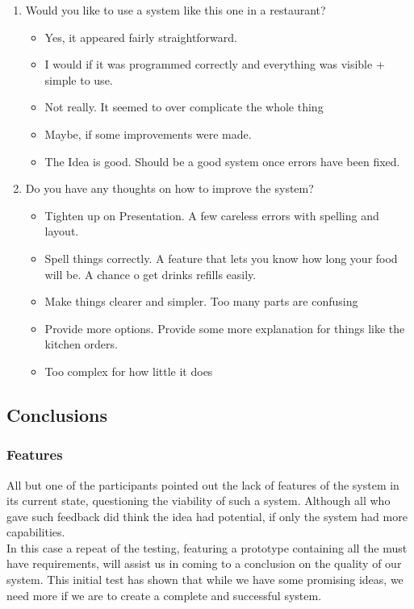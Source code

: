 \documentclass[11pt, a4paper]{report}
\begin{document}
\begin{enumerate}
\item Would you like to use a system like this one in a restaurant? \\
\begin{itemize} 
\item Yes, it appeared fairly straightforward.
\item I would if it was programmed correctly and everything was visible + simple to use.
\item Not really. It seemed to over complicate the whole thing
\item Maybe, if some improvements were made.
\item The Idea is good. Should be a good system once errors have been fixed.
\end{itemize}
 
\item Do you have any thoughts on how to improve the system?\\
\begin{itemize}
\item Tighten up on Presentation. A few careless errors with spelling and layout.
\item Spell things correctly. A feature that lets you know how long your food will be. A chance o get drinks refills easily. 
\item Make things clearer and simpler. Too many parts are confusing
\item Provide more options. Provide some more explanation for things like the kitchen orders. 
\item Too complex for how little it does 
\end{itemize} 

\end{enumerate}
\subsection{Conclusions} 
\subsubsection{Features} 
All   but   one   of   the   participants   pointed   out   the   lack   of   features   of   the   system   in   its current   state,   questioning   the   viability   of   such   a   system.   Although   all   who   gave   such feedback   did   think   the   idea   had   potential,   if   only   the   system   had   more   capabilities.\\
In   this   case   a   repeat   of   the   testing,   featuring   a   prototype   containing   all   the   must have   requirements,   will   assist   us   in   coming   to   a   conclusion   on   the   quality   of   our system.   This   initial   test   has   shown   that   while   we   have   some   promising   ideas,   we need   more   if   we   are   to   create   a   complete   and   successful   system.\\
\end{document}
